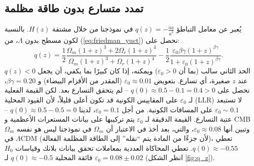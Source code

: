 \documentclass[11pt,a4paper]{article}
\begin{document}
	\subsection{تمدد متسارع بدون طاقة مظلمة}
	
	يُعبر عن معامل التباطؤ $q(z) = -\frac{\ddot{a}a}{\dot{a}^2}$ في نموذجنا من خلال مشتقة $H(z)$. بالنسبة لكون مسطح بدون $\Lambda$، من (\ref{eq:friedman_yuct}) نحصل على:
	\begin{equation}
		q(z) = \frac{1}{2}\frac{\Omega_m (1+z)^3 + 2\Omega_r (1+z)^4}{\Omega_m (1+z)^3 + \Omega_r (1+z)^4} - \frac{1}{2}\frac{\varepsilon_0 \beta\gamma (1+z)^{\beta\gamma}}{1 + \varepsilon_0 (1+z)^{\beta\gamma}}.
		\label{eq:deceleration}
	\end{equation}
	الحد الثاني سالب (بما أن $\varepsilon_0>0$) ويمكنه، إذا كان كبيرًا بما يكفي، أن يجعل $q(z)<0$ عند $z$ صغيرة، أي تسارع. بتعويض $\varepsilon_0 \approx 0.01$ (المقدر من الأقزام البيضاء) و $\beta\gamma=0.20$، نحصل على $q(0) \approx 0.5 - 0.1 = 0.4 > 0$ – لم يتحقق التسارع بعد. لكن القيمة الفعلية لـ $\varepsilon_0$ على المقاييس الكونية قد تكون أعلى قليلاً، لأن القيود المحلية (LLR) لا تستبعد $\varepsilon_0 \sim 0.1$ على المسافات الكونية. من أجل $\varepsilon_0 = 0.1$، لدينا $q(0) \approx 0.5 - 0.5 = 0$ – عتبة التسارع. القيمة الدقيقة لـ $\varepsilon_0$ يتم تركيبها على بيانات المستعرات الأعظمية و CMB وتبين أنها $\varepsilon_0 \approx 0.08$، والتي، بعد أخذ في الاعتبار أن $\Omega_m$ في نموذجنا ليس هو نفسه $\Omega_m$ في $\Lambda$CDM (لأن جزءًا من المادة يتم ``نقله'' إلى الطاقة المظلمة الفعالة)، تعطي $q(0) \approx -0.55$. تعطي المحاكاة العددية بمعاملات تحقق بيانات بلانك وقياسات $H_0$ فائقة المحلية $q(0) \approx -0.5$ لـ $\varepsilon_0 = 0.08 \pm 0.02$ (انظر الشكل \ref{fig:q_z}).
	
\end{document}

